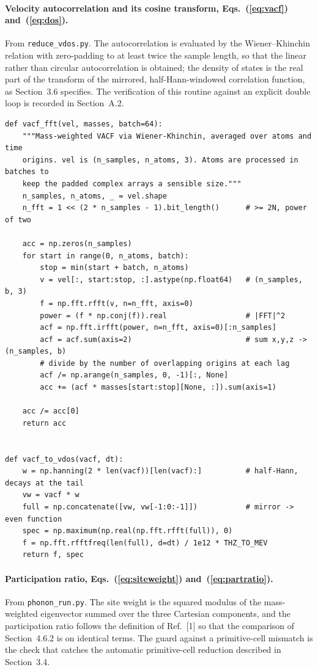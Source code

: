 \paragraph{Velocity autocorrelation and its cosine transform, Eqs.~(\ref{eq:vacf}) and~(\ref{eq:dos}).}
From \texttt{reduce\_vdos.py}. The autocorrelation is evaluated by the
Wiener--Khinchin relation with zero-padding to at least twice the sample
length, so that the linear rather than circular autocorrelation is obtained;
the density of states is the real part of the transform of the mirrored,
half-Hann-windowed correlation function, as Section~3.6 specifies. The
verification of this routine against an explicit double loop is recorded in Section~A.2.

\begin{lstlisting}
def vacf_fft(vel, masses, batch=64):
    """Mass-weighted VACF via Wiener-Khinchin, averaged over atoms and time
    origins. vel is (n_samples, n_atoms, 3). Atoms are processed in batches to
    keep the padded complex arrays a sensible size."""
    n_samples, n_atoms, _ = vel.shape
    n_fft = 1 << (2 * n_samples - 1).bit_length()      # >= 2N, power of two

    acc = np.zeros(n_samples)
    for start in range(0, n_atoms, batch):
        stop = min(start + batch, n_atoms)
        v = vel[:, start:stop, :].astype(np.float64)   # (n_samples, b, 3)
        f = np.fft.rfft(v, n=n_fft, axis=0)
        power = (f * np.conj(f)).real                  # |FFT|^2
        acf = np.fft.irfft(power, n=n_fft, axis=0)[:n_samples]
        acf = acf.sum(axis=2)                          # sum x,y,z -> (n_samples, b)
        # divide by the number of overlapping origins at each lag
        acf /= np.arange(n_samples, 0, -1)[:, None]
        acc += (acf * masses[start:stop][None, :]).sum(axis=1)

    acc /= acc[0]
    return acc


def vacf_to_vdos(vacf, dt):
    w = np.hanning(2 * len(vacf))[len(vacf):]          # half-Hann, decays at the tail
    vw = vacf * w
    full = np.concatenate([vw, vw[-1:0:-1]])           # mirror -> even function
    spec = np.maximum(np.real(np.fft.rfft(full)), 0)
    f = np.fft.rfftfreq(len(full), d=dt) / 1e12 * THZ_TO_MEV
    return f, spec
\end{lstlisting}

\paragraph{Participation ratio, Eqs.~(\ref{eq:siteweight}) and~(\ref{eq:partratio}).}
From \texttt{phonon\_run.py}. The site weight is the squared modulus of the
mass-weighted eigenvector summed over the three Cartesian components, and the
participation ratio follows the definition of Ref.~[1] so that the comparison
of Section~4.6.2 is on identical terms. The guard against a primitive-cell
mismatch is the check that catches the automatic primitive-cell reduction
described in Section~3.4.

